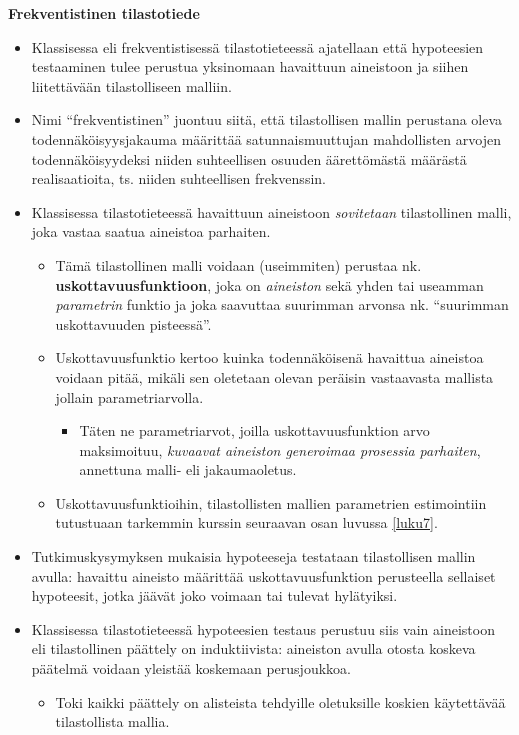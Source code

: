 \documentclass[
]{book}
\providecommand{\tightlist}{%
  \setlength{\itemsep}{0pt}\setlength{\parskip}{0pt}}
\begin{document}
\hfill\break

\textbf{Frekventistinen tilastotiede}

\begin{itemize}
\item
  Klassisessa eli frekventistisessä tilastotieteessä ajatellaan että hypoteesien testaaminen tulee perustua yksinomaan havaittuun aineistoon ja siihen liitettävään tilastolliseen malliin.
\item
  Nimi ``frekventistinen'' juontuu siitä, että tilastollisen mallin perustana oleva todennäköisyysjakauma määrittää satunnaismuuttujan mahdollisten arvojen todennäköisyydeksi niiden suhteellisen osuuden äärettömästä määrästä realisaatioita, ts. niiden suhteellisen frekvenssin.
\item
  Klassisessa tilastotieteessä havaittuun aineistoon \emph{sovitetaan} tilastollinen malli, joka vastaa saatua aineistoa parhaiten.

  \begin{itemize}
  \tightlist
  \item
    Tämä tilastollinen malli voidaan (useimmiten) perustaa nk. \textbf{uskottavuusfunktioon}, joka on \emph{aineiston} sekä yhden tai useamman \emph{parametrin} funktio ja joka saavuttaa suurimman arvonsa nk. ``suurimman uskottavuuden pisteessä''.
  \item
    Uskottavuusfunktio kertoo kuinka todennäköisenä havaittua aineistoa voidaan pitää, mikäli sen oletetaan olevan peräisin vastaavasta mallista jollain parametriarvolla.

    \begin{itemize}
    \tightlist
    \item
      Täten ne parametriarvot, joilla uskottavuusfunktion arvo maksimoituu, \emph{kuvaavat aineiston generoimaa prosessia parhaiten}, annettuna malli- eli jakaumaoletus.
    \end{itemize}
  \item
    Uskottavuusfunktioihin, tilastollisten mallien parametrien estimointiin tutustuaan tarkemmin kurssin seuraavan osan luvussa \ref{luku7}.
  \end{itemize}
\item
  Tutkimuskysymyksen mukaisia hypoteeseja testataan tilastollisen mallin avulla: havaittu aineisto määrittää uskottavuusfunktion perusteella sellaiset hypoteesit, jotka jäävät joko voimaan tai tulevat hylätyiksi.
\item
  Klassisessa tilastotieteessä hypoteesien testaus perustuu siis vain aineistoon eli tilastollinen päättely on induktiivista: aineiston avulla otosta koskeva päätelmä voidaan yleistää koskemaan perusjoukkoa.

  \begin{itemize}
  \tightlist
  \item
    Toki kaikki päättely on alisteista tehdyille oletuksille koskien käytettävää tilastollista mallia.
  \end{itemize}
\end{itemize}
\end{document}

